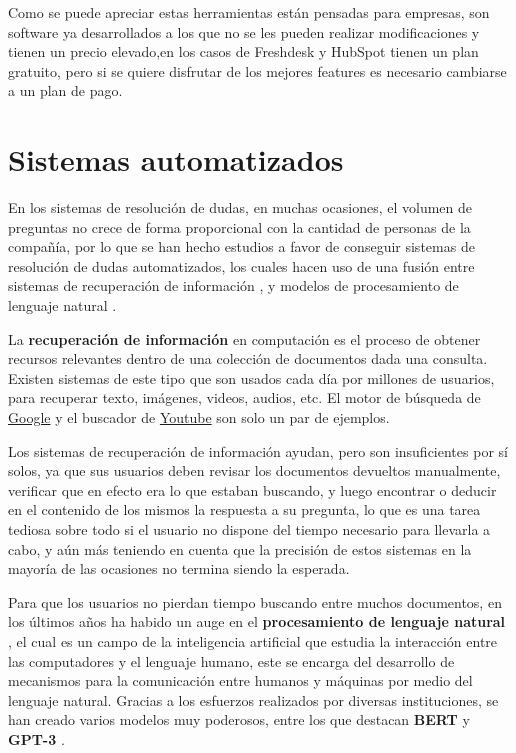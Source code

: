 Como se puede apreciar estas herramientas están pensadas para empresas, son software ya desarrollados a los que no se les pueden realizar modificaciones y tienen un precio elevado,en los casos de Freshdesk y HubSpot tienen un plan gratuito, pero si se quiere disfrutar de los mejores features es necesario cambiarse a un plan de pago.

\section{Sistemas automatizados}

En los sistemas de resolución de dudas, en muchas ocasiones, el volumen de preguntas no crece de forma proporcional con la cantidad de personas de la compañía, por lo que se han hecho estudios a favor de conseguir sistemas de resolución de dudas automatizados, los cuales hacen uso de una fusión entre sistemas de recuperación de información \cite{ir}, y modelos de procesamiento de lenguaje natural \cite{nlp}.
\newline

La \textbf{recuperación de información} \cite{ir} en computación es el proceso de obtener recursos relevantes dentro de una colección de documentos dada una consulta. Existen sistemas de este tipo que son usados cada día por millones de usuarios, para recuperar texto, imágenes, videos, audios, etc. El motor de búsqueda de \href{google.com}{Google} y el buscador de \href{youtube.com}{Youtube} son solo un par de ejemplos.
\newline

Los sistemas de recuperación de información ayudan, pero son insuficientes por sí solos, ya que sus usuarios deben revisar los documentos devueltos manualmente, verificar que en efecto era lo que estaban buscando, y luego encontrar o deducir en el contenido de los mismos la respuesta a su pregunta, lo que es una tarea tediosa sobre todo si el usuario no dispone del tiempo necesario para llevarla a cabo, y aún más teniendo en cuenta que la precisión de estos sistemas en la mayoría de las ocasiones no termina siendo la esperada.
\newline

Para que los usuarios no pierdan tiempo buscando entre muchos documentos, en los últimos años ha habido un auge en el \textbf{procesamiento de lenguaje natural} \cite{nlp}, el cual es un campo de la inteligencia artificial que estudia la interacción entre las computadores y el lenguaje humano, este se encarga del desarrollo de mecanismos para la comunicación entre humanos y máquinas por medio del lenguaje natural. Gracias a los esfuerzos realizados por diversas instituciones, se han creado varios modelos muy poderosos, entre los que destacan \textbf{BERT} \cite{bert} y \textbf{GPT-3} \cite{gpt}.
\newline

